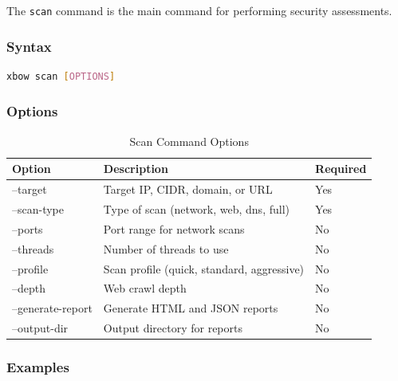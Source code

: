 \documentclass[12pt,a4paper]{report}
\begin{document}
The \texttt{scan} command is the main command for performing security assessments.

\subsubsection{Syntax}

\begin{lstlisting}[language=bash]
xbow scan [OPTIONS]
\end{lstlisting}

\subsubsection{Options}

\begin{table}[H]
    \centering
    \caption{Scan Command Options}
    \label{tab:scan_options}
    \begin{tabular}{@{}p{3cm}p{8cm}p{2cm}@{}}
        \toprule
        Option & Description & Required \\
        \midrule
        --target & Target IP, CIDR, domain, or URL & Yes \\
        --scan-type & Type of scan (network, web, dns, full) & Yes \\
        --ports & Port range for network scans & No \\
        --threads & Number of threads to use & No \\
        --profile & Scan profile (quick, standard, aggressive) & No \\
        --depth & Web crawl depth & No \\
        --generate-report & Generate HTML and JSON reports & No \\
        --output-dir & Output directory for reports & No \\
        \bottomrule
    \end{tabular}
\end{table}

\subsubsection{Examples}
\end{document}

